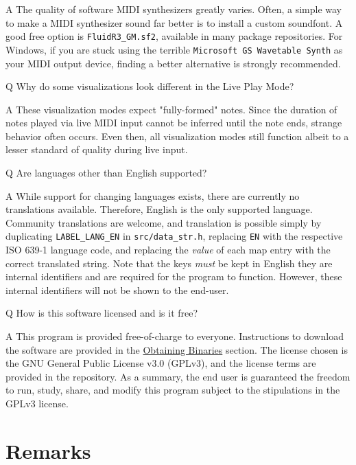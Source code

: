 \documentclass[english]{article}
\newcommand\faqQ[1]{%
  \leavevmode\par
  \noindent
{\hspace{4pt}\Large Q} \raisebox{0.1em}{\textendash{}} {\large #1}\par \vspace{-0.5em}}
\newcommand\faqA[2][]{%
  \leavevmode\par\noindent
  {\leftskip30pt
  {\large A} \raisebox{0.05em}{\textendash{}} \textbf{#1}#2\par \vspace{-0.25em}}}
\providecommand{\mi}[1]{\texttt{#1}}
\begin{document}
\faqA{The quality of software MIDI synthesizers greatly varies. Often, a simple way to make a MIDI synthesizer sound
far better is to install a custom soundfont. A good free option is \mi{FluidR3_GM.sf2}, available in many
package repositories. For Windows, if you are stuck using the terrible \mi{Microsoft GS Wavetable Synth} as your
MIDI output device, finding a better alternative is strongly recommended.}

\newpage

\faqQ{Why do some visualizations look different in the Live Play Mode?}

\faqA{These visualization modes expect "fully-formed" notes.
Since the duration of notes played via live MIDI input cannot be inferred until the note ends, 
strange behavior often occurs. Even then,
all visualization modes still function \textendash{} albeit to a lesser standard of quality \textendash{} during live input. 
}

\faqQ{Are languages other than English supported?}

\faqA{While support for changing languages exists, there are currently no translations available. Therefore,
English is the only supported language. Community translations are welcome, and translation is possible simply by
duplicating \mi{LABEL_LANG_EN} in \mi{src/data_str.h}, replacing \mi{EN} with the respective ISO 639-1 language code,
and replacing the \textit{value} of each map entry with the correct translated string. Note that the keys \textit{must} be
kept in English \textendash{} they are internal identifiers and are required for the program to function. However, these internal
identifiers will not be shown to the end-user.}

\faqQ{How is this software licensed and is it free?}

\faqA{This program is provided free-of-charge to everyone. Instructions to download the software are provided in the
\textcolor{lcol}{\hyperref[sec:obtain]{Obtaining Binaries}} section. The license chosen is the GNU General 
Public License v3.0 (GPLv3), and the license terms are provided in the repository. As a summary, the end user is 
guaranteed the freedom to run, study, share, and modify this program subject to the stipulations in the GPLv3 license.}


\section{Remarks}
\end{document}
